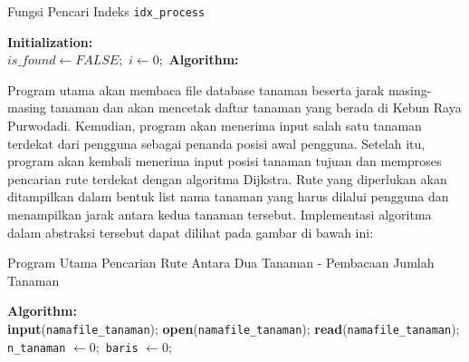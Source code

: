 \documentclass[conference]{IEEEtran}
\begin{document}
    \begin{algorithm}
        \SetAlgoLined
        \DontPrintSemicolon
        \caption{Fungsi Pencari Indeks \texttt{idx\_process}}
        \textbf{Initialization:}\\
        $is\_found \gets FALSE;$\;
        $i \gets 0;$\;
        \textbf{Algorithm:}\\
    \end{algorithm}
    \setlength{\intextsep}{0pt} 
    Program   utama   akan   membaca   file   database   tanaman
    beserta  jarak  masing-masing  tanaman  dan  akan  mencetak
    daftar   tanaman   yang   berada   di   Kebun   Raya   Purwodadi.
    Kemudian, program akan menerima input salah satu tanaman
    terdekat dari pengguna sebagai penanda posisi awal pengguna.
    Setelah  itu,  program  akan  kembali  menerima  input  posisi
    tanaman tujuan dan memproses pencarian rute terdekat dengan
    algoritma  Dijkstra.  Rute  yang  diperlukan  akan  ditampilkan
    dalam bentuk list nama tanaman yang harus dilalui pengguna
    dan   menampilkan   jarak   antara   kedua   tanaman   tersebut.
    Implementasi algoritma dalam abstraksi tersebut dapat dilihat
    pada gambar di bawah ini:
    \begin{algorithm}
        \SetAlgoLined
        \DontPrintSemicolon
        \caption{Program Utama Pencarian Rute Antara Dua Tanaman - Pembacaan Jumlah Tanaman}
        \textbf{Algorithm:}\\
        \textbf{input}(\texttt{namafile\_tanaman});\;
        \textbf{open}(\texttt{namafile\_tanaman});\;
        \textbf{read}(\texttt{namafile\_tanaman});\;
        \texttt{n\_tanaman} $\gets 0;$\;
        \texttt{baris} $\gets 0;$\;
    \end{algorithm}
\end{document}
